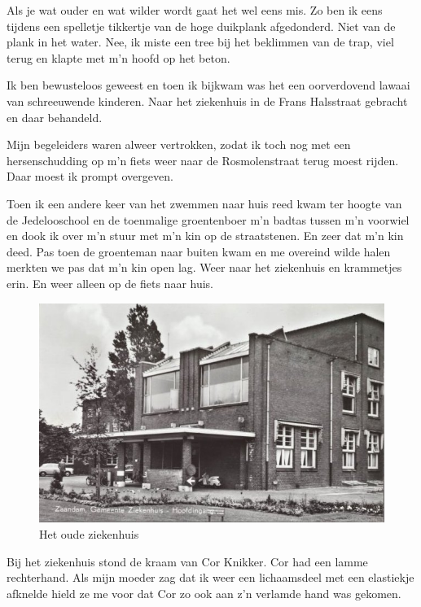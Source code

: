 \documentclass[12pt,twoside, openright]{memoir}
\begin{document}
Als je wat ouder en wat wilder wordt gaat het wel eens mis. Zo ben ik eens tijdens een spelletje tikkertje van de hoge duikplank afgedonderd. Niet van de plank in het water. Nee, ik miste een tree bij het beklimmen van de trap, viel terug en klapte met m’n hoofd op het beton. 

Ik ben bewusteloos geweest en toen ik bijkwam was het een oorverdovend lawaai van schreeuwende kinderen. Naar het ziekenhuis in de Frans Halsstraat gebracht en daar behandeld.

Mijn begeleiders waren alweer vertrokken, zodat ik toch nog met een hersenschudding op m’n fiets weer naar de Rosmolenstraat terug moest rijden. Daar moest ik prompt overgeven. 

Toen ik een andere keer van het zwemmen naar huis reed kwam ter hoogte van de Jedelooschool en de toenmalige groentenboer m’n badtas tussen m’n voorwiel en dook ik over m’n stuur met m’n kin op de straatstenen. En zeer dat m’n kin deed. Pas toen de groenteman naar buiten kwam en me overeind wilde halen merkten we pas dat m’n kin open lag. Weer naar het ziekenhuis en krammetjes erin. En weer alleen op de fiets naar huis.

\begin{figure}
\centering
\includegraphics[width=\textwidth]{img/80ZiekenhuisFrHallstr}
\caption*{\footnotesize Het oude ziekenhuis}
\end{figure}

Bij het ziekenhuis stond de kraam van Cor Knikker. Cor had een lamme rechterhand. Als mijn moeder zag dat ik weer een lichaamsdeel met een elastiekje afknelde hield ze me voor dat Cor zo ook aan z’n verlamde hand was gekomen.
\end{document}
